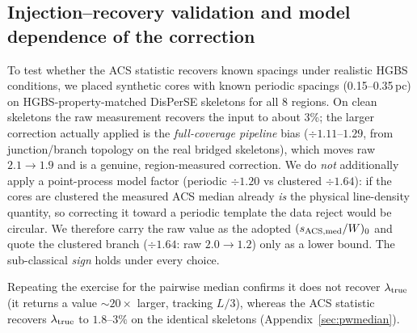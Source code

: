 \documentclass[usenatbib,twoside,twocolumn]{mnras}
\begin{document}
\subsection{Injection--recovery validation and model dependence of the correction}
\label{sec:injection_recovery}

To test whether the ACS statistic recovers known spacings under realistic HGBS conditions, we placed synthetic cores with known periodic spacings (0.15--0.35\,pc) on HGBS-property-matched DisPerSE skeletons for all 8 regions. On clean skeletons the raw measurement recovers the input to about $3$\%; the larger correction actually applied is the \emph{full-coverage pipeline} bias ($\div1.11$--$1.29$, from junction/branch topology on the real bridged skeletons), which moves raw $2.1\to1.9$ and is a genuine, region-measured correction. We do \emph{not} additionally apply a point-process model factor (periodic $\div1.20$ vs clustered $\div1.64$): if the cores are clustered the measured ACS median already \emph{is} the physical line-density quantity, so correcting it toward a periodic template the data reject would be circular. We therefore carry the raw value as the adopted $(s_{\rm ACS,med}/W)_0$ and quote the clustered branch ($\div1.64$: raw $2.0\to1.2$) only as a lower bound. The sub-classical \emph{sign} holds under every choice.

Repeating the exercise for the pairwise median confirms it does not recover $\lambda_{\rm true}$ (it returns a value $\sim$$20\times$ larger, tracking $L/3$), whereas the ACS statistic recovers $\lambda_{\rm true}$ to $1.8$--$3\%$ on the identical skeletons (Appendix~\ref{sec:pwmedian}).
\end{document}
